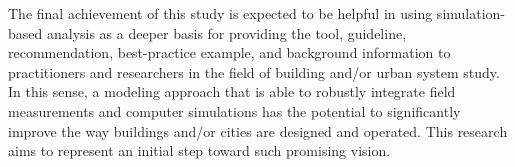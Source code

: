 The final achievement of this study is expected to be helpful in using simulation-based analysis as a deeper basis for providing the tool, guideline, recommendation, best-practice example, and background information to practitioners and researchers in the field of building and/or urban system study. In this sense, a modeling approach that is able to robustly integrate field measurements and computer simulations has the potential to significantly improve the way buildings and/or cities are designed and operated. This research aims to represent an initial step toward such promising vision.
